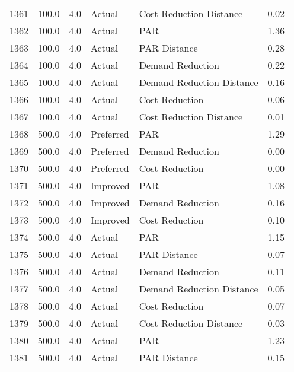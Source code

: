 \begin{longtable}{lrrllr}
1361 &        100.0 &     4.0 &         Actual &    Cost Reduction Distance &   0.02 \\
1362 &        100.0 &     4.0 &         Actual &                        PAR &   1.36 \\
1363 &        100.0 &     4.0 &         Actual &               PAR Distance &   0.28 \\
1364 &        100.0 &     4.0 &         Actual &           Demand Reduction &   0.22 \\
1365 &        100.0 &     4.0 &         Actual &  Demand Reduction Distance &   0.16 \\
1366 &        100.0 &     4.0 &         Actual &             Cost Reduction &   0.06 \\
1367 &        100.0 &     4.0 &         Actual &    Cost Reduction Distance &   0.01 \\
1368 &        500.0 &     4.0 &      Preferred &                        PAR &   1.29 \\
1369 &        500.0 &     4.0 &      Preferred &           Demand Reduction &   0.00 \\
1370 &        500.0 &     4.0 &      Preferred &             Cost Reduction &   0.00 \\
1371 &        500.0 &     4.0 &       Improved &                        PAR &   1.08 \\
1372 &        500.0 &     4.0 &       Improved &           Demand Reduction &   0.16 \\
1373 &        500.0 &     4.0 &       Improved &             Cost Reduction &   0.10 \\
1374 &        500.0 &     4.0 &         Actual &                        PAR &   1.15 \\
1375 &        500.0 &     4.0 &         Actual &               PAR Distance &   0.07 \\
1376 &        500.0 &     4.0 &         Actual &           Demand Reduction &   0.11 \\
1377 &        500.0 &     4.0 &         Actual &  Demand Reduction Distance &   0.05 \\
1378 &        500.0 &     4.0 &         Actual &             Cost Reduction &   0.07 \\
1379 &        500.0 &     4.0 &         Actual &    Cost Reduction Distance &   0.03 \\
1380 &        500.0 &     4.0 &         Actual &                        PAR &   1.23 \\
1381 &        500.0 &     4.0 &         Actual &               PAR Distance &   0.15 \\

\end{longtable}
